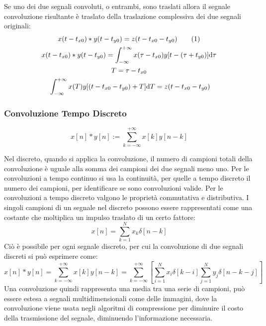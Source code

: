 \documentclass{article}
\newcommand{\df}{\mathrm{d}}
\newcommand{\tageq}{\tag{\stepcounter{equation}\theequation}}
\numberwithin{equation}{subsection}
\begin{document}
Se uno dei due segnali convoluti, o entrambi, sono traslati allora il segnale convoluzione risultante è traslato della traslazione complessiva dei due segnali originali:
\begin{gather*}
    x(t-t_{x0})*y(t-t_{y0})=z(t-t_{x0}-t_{y0})\tageq\\
    x(t-t_{x0})*y(t-t_{y0})=\displaystyle\int_{-\infty}^{+\infty}x(\tau-t_{x0})y[t-(\tau+t_{y0})]\df\tau\\
    {T=\tau-t_{x0}}\\\
    \int_{-\infty}^{+\infty}x(T)y[(t-t_{x0}-t_{y0})+T]\df T=z(t-t_{x0}-t_{y0})
\end{gather*}

\subsubsection{Convoluzione Tempo Discreto}

\begin{equation}
    x[n]*y[n]:=\displaystyle\sum_{k=-\infty}^{+\infty}x[k]y[n-k]
\end{equation}

Nel discreto, quando si applica la convoluzione, il numero di campioni totali della convoluzione è uguale alla somma dei campioni dei due segnali meno uno. Per le convoluzioni 
a tempo continuo si usa la continuità, per quelle a tempo discreto il numero dei campioni, per identificare se sono convoluzioni valide. Per le convoluzioni a tempo discreto valgono le proprietà 
commutativa e distributiva. I singoli campioni di un segnale nel discreto possono essere rappresentati come una costante che moltiplica un impulso traslato di un certo fattore:
\begin{equation*}
    x[n]=\displaystyle\sum_{k=1}^Nx_k\delta[n-k]
\end{equation*}
Ciò è possibile per ogni segnale discreto, per cui la convoluzione di due segnali discreti si può esprimere come:
\begin{equation*}
    x[n]*y[n]=\displaystyle\sum_{k=-\infty}^{+\infty}x[k]y[n-k]=\sum_{k=-\infty}^{+\infty}\left[\sum_{i=1}^Nx_i\delta[k-i]\sum_{j=1}^Ny_j\delta[n-k-j]\right]
\end{equation*}
Una convoluzione quindi rappresenta una media tra una serie di campioni, può essere estesa a segnali multidimensionali come delle immagini, dove la convoluzione viene 
usata negli algoritmi di compressione per diminuire il costo della trasmissione del segnale, diminuendo l'informazione necessaria. 
\end{document}

